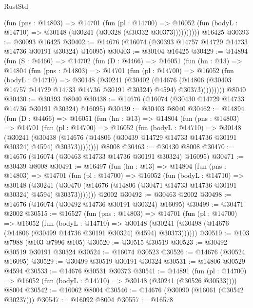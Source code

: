 \begin{lexlean}{RustStd}
\begin{coremodule}
            (fun (pns : @14803) =>
            @14701
              (fun (pl : @14700) =>
              @16052 (fun (bodyL : @14710) => @30148 (@30241 (@30328 (@30332 @30373))))))))))
    @16425
@30393 := @30093 @16425
@30402 := @14676 (@16074 (@30393 @14757 @14729 @14733 @14736 @30191 @30324) @16095)
@30403 := @30104 @16425
@30429 := @14894
    (fun (S : @4466) =>
    @14702
      (fun (D : @4466) =>
      @16051
        (fun (hn : @13) =>
        @14804
          (fun (pns : @14803) =>
          @14701
            (fun (pl : @14700) =>
            @16052
              (fun (bodyL : @14710) =>
              @30148
                (@30241
                  (@30402
                    (@14676
                      (@14806 (@30403 @14757 @14729 @14733 @14736 @30191 @30324) @4594)
                      @30373)))))))))
    @8040
@30430 := @30393 @8040
@30438 := @14676 (@16074 (@30430 @14729 @14733 @14736 @30191 @30324) @16095)
@30439 := @30403 @8040
@30462 := @14894
    (fun (D : @4466) =>
    @16051
      (fun (hn : @13) =>
      @14804
        (fun (pns : @14803) =>
        @14701
          (fun (pl : @14700) =>
          @16052
            (fun (bodyL : @14710) =>
            @30148
              (@30241
                (@30438
                  (@14676 (@14806 (@30439 @14729 @14733 @14736 @30191 @30324) @4594) @30373))))))))
    @8008
@30463 := @30430 @8008
@30470 := @14676 (@16074 (@30463 @14733 @14736 @30191 @30324) @16095)
@30471 := @30439 @8008
@30491 := @16497
    (fun (hn : @13) =>
    @14804
      (fun (pns : @14803) =>
      @14701
        (fun (pl : @14700) =>
        @16052
          (fun (bodyL : @14710) =>
          @30148
            (@30241
              (@30470 (@14676 (@14806 (@30471 @14733 @14736 @30191 @30324) @4594) @30373)))))))
    @2002
@30492 := @30463 @2002
@30498 := @14676 (@16074 (@30492 @14736 @30191 @30324) @16095)
@30499 := @30471 @2002
@30515 := @16527
    (fun (pns : @14803) =>
    @14701
      (fun (pl : @14700) =>
      @16052
        (fun (bodyL : @14710) =>
        @30148 (@30241 (@30498 (@14676 (@14806 (@30499 @14736 @30191 @30324) @4594) @30373))))))
@30519 := @103 @7988 (@103 @7996 @105)
@30520 := @30515 @30519
@30523 := @30492 @30519 @30191 @30324
@30524 := @16074 @30523
@30526 := @14676 (@30524 @16095)
@30529 := @30499 @30519 @30191 @30324
@30531 := @14806 @30529 @4594
@30533 := @14676 @30531 @30373
@30541 := @14891
    (fun (pl : @14700) => @16052 (fun (bodyL : @14710) => @30148 (@30241 (@30526 @30533))))
    @8004
@30542 := @16062 @8004
@30546 := @14676 (@30090 (@16061 (@30542 @30237)))
@30547 := @16092 @8004
@30557 := @16578

\end{coremodule}
\end{lexlean}
